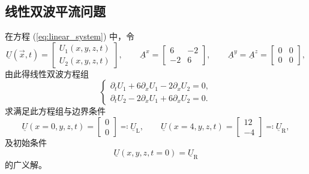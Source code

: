 \subsection{线性双波平流问题}
\begin{problem}
[线性双波平流]\label{prob:=007EBF=006027=0053CC=006CE2=005E73=006D41}在方程
(\ref{eq:linear_system}) 中，令
\begin{equation}
\underline{U}(\vec{x},t)=\begin{bmatrix}U_{1}(x,y,z,t)\\
U_{2}(x,y,z,t)
\end{bmatrix},\qquad\underline{A}^{x}=\begin{bmatrix}6 & -2\\
-2 & 6
\end{bmatrix},\qquad\underline{A}^{y}=\underline{A}^{z}=\begin{bmatrix}0 & 0\\
0 & 0
\end{bmatrix},
\end{equation}
由此得线性双波方程组
\begin{equation}
\begin{cases}
\partial_{t}U_{1}+6\partial_{x}U_{1}-2\partial_{x}U_{2}=0,\\
\partial_{t}U_{2}-2\partial_{x}U_{1}+6\partial_{x}U_{2}=0.
\end{cases}\label{eq:linear_double_wave}
\end{equation}
求满足此方程组与边界条件
\begin{equation}
\underline{U}(x=0,y,z,t)=\begin{bmatrix}0\\
0
\end{bmatrix}\eqqcolon\underline{U}_{\mathrm{L}},\qquad\underline{U}(x=4,y,z,t)=\begin{bmatrix}12\\
-4
\end{bmatrix}\eqqcolon\underline{U}_{\mathrm{R}},
\end{equation}
及初始条件
\begin{equation}
\underline{U}(x,y,z,t=0)=\underline{U}_{\mathrm{R}}
\end{equation}
的广义解。
\end{problem}

